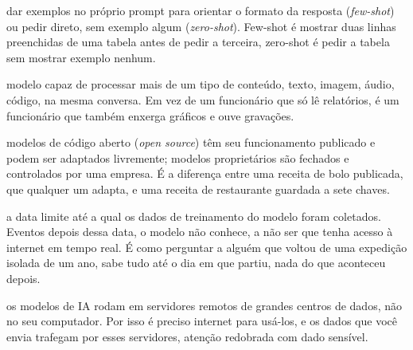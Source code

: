 \documentclass[11pt,a4paper]{article}
\begin{document}
\begin{description}[style=nextline,leftmargin=0pt,itemsep=6pt]
  \item[\poppinsmed\color{azulUNI}Few-shot/zero-shot] dar exemplos no próprio prompt para orientar o formato da resposta (\textit{few-shot}) ou pedir direto, sem exemplo algum (\textit{zero-shot}). Few-shot é mostrar duas linhas preenchidas de uma tabela antes de pedir a terceira, zero-shot é pedir a tabela sem mostrar exemplo nenhum.
  \item[\poppinsmed\color{azulUNI}Multimodal] modelo capaz de processar mais de um tipo de conteúdo, texto, imagem, áudio, código, na mesma conversa. Em vez de um funcionário que só lê relatórios, é um funcionário que também enxerga gráficos e ouve gravações.
  \item[\poppinsmed\color{azulUNI}Código aberto vs. proprietário] modelos de código aberto (\textit{open source}) têm seu funcionamento publicado e podem ser adaptados livremente; modelos proprietários são fechados e controlados por uma empresa. É a diferença entre uma receita de bolo publicada, que qualquer um adapta, e uma receita de restaurante guardada a sete chaves.
  \item[\poppinsmed\color{azulUNI}Corte de conhecimento] a data limite até a qual os dados de treinamento do modelo foram coletados. Eventos depois dessa data, o modelo não conhece, a não ser que tenha acesso à internet em tempo real. É como perguntar a alguém que voltou de uma expedição isolada de um ano, sabe tudo até o dia em que partiu, nada do que aconteceu depois.
  \item[\poppinsmed\color{azulUNI}Nuvem (cloud)] os modelos de IA rodam em servidores remotos de grandes centros de dados, não no seu computador. Por isso é preciso internet para usá-los, e os dados que você envia trafegam por esses servidores, atenção redobrada com dado sensível.
\end{description}

\end{document}
